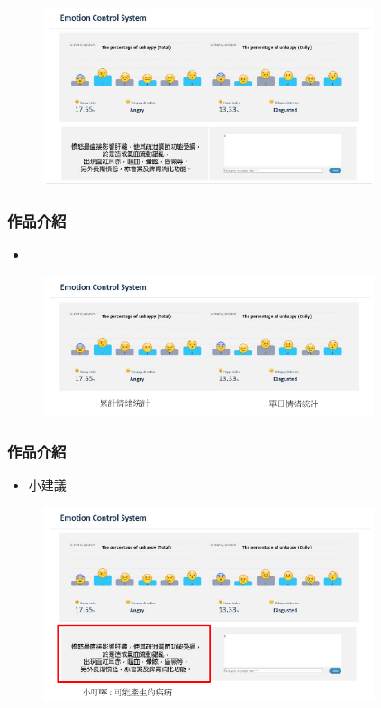 \documentclass[10pt, conference, compsocconf]{beamer}
\begin{document}
\begin{CJK}{UTF8}{}
\begin{frame}
\begin{figure}[!t]
\begin{center}
\includegraphics[width=9.7cm]{./Figures/web.pdf}
\end{center}
\end{figure}

\end{frame}

\begin{frame}
\frametitle{作品介紹}
\begin{itemize}
\item {}
\end{itemize}

\begin{figure}[!t]
\begin{center}
\includegraphics[width=9.7cm]{./Figures/web2.pdf}
\end{center}
\end{figure}

\end{frame}

\begin{frame}
\frametitle{作品介紹}
\begin{itemize}
\item \Large 小建議
\end{itemize}

\begin{figure}[!t]
\begin{center}
\includegraphics[width=9.7cm]{./Figures/web3.pdf}
\end{center}
\end{figure}


\end{frame}
\end{CJK}
\end{document}
